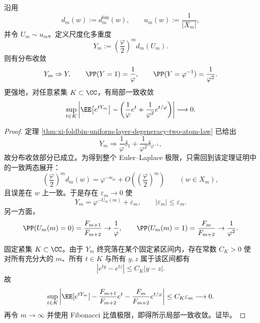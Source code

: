 \begin{theorem}\label{thm:conclusion-binfold-uniform-euler-laplace-twoatom}
沿用
\[
d_m(w):=d_m^{\mathrm{bin}}(w),
\qquad
u_m(w):=\frac{1}{|X_m|},
\]
并令 \(U_m\sim u_m\)。定义尺度化多重度
\[
Y_m:=\left(\frac{\varphi}{2}\right)^m d_m(U_m).
\]
则有分布收敛
\[
Y_m\Rightarrow Y,
\qquad
\PP(Y=1)=\frac{1}{\varphi},
\qquad
\PP(Y=\varphi^{-1})=\frac{1}{\varphi^2}.
\]
更强地，对任意紧集 \(K\subset\CC\)，有局部一致收敛
\[
\sup_{t\in K}
\left|
\EE\!\left[e^{tY_m}\right]
-
\left(
\frac{1}{\varphi}e^t+\frac{1}{\varphi^2}e^{t/\varphi}
\right)
\right|
\longrightarrow 0.
\]
\end{theorem}
\begin{proof}
定理 \ref{thm:xi-foldbin-uniform-layer-degeneracy-two-atom-law} 已给出
\[
Y_m\Rightarrow
\frac{1}{\varphi}\delta_1+\frac{1}{\varphi^2}\delta_{\varphi^{-1}},
\]
故分布收敛部分已成立。为得到整个 Euler--Laplace 极限，只需回到该定理证明中的一致两态展开：
\[
\left(\frac{\varphi}{2}\right)^m d_m(w)
=
\varphi^{-w_m}+O\!\left(\left(\frac{\varphi}{2}\right)^m\right)
\qquad (w\in X_m),
\]
且误差在 \(w\) 上一致。于是存在 \(\varepsilon_m\to 0\) 使
\[
Y_m=\varphi^{-U_m(m)}+\varepsilon_m,
\qquad
|\varepsilon_m|\le \varepsilon_m.
\]
另一方面，
\[
\PP(U_m(m)=0)=\frac{F_{m+1}}{F_{m+2}}\to \frac{1}{\varphi},
\qquad
\PP(U_m(m)=1)=\frac{F_m}{F_{m+2}}\to \frac{1}{\varphi^2}.
\]

固定紧集 \(K\subset\CC\)。由于 \(Y_m\) 终究落在某个固定紧区间内，存在常数 \(C_K>0\) 使对所有充分大的 \(m\)、所有 \(t\in K\) 与所有 \(y,z\) 属于该区间都有
\[
|e^{ty}-e^{tz}|\le C_K|y-z|.
\]
故
\[
\sup_{t\in K}
\left|
\EE[e^{tY_m}]
-
\frac{F_{m+1}}{F_{m+2}}e^t
-
\frac{F_m}{F_{m+2}}e^{t/\varphi}
\right|
\le
C_K\varepsilon_m
\longrightarrow 0.
\]
再令 \(m\to\infty\) 并使用 Fibonacci 比值极限，即得所示局部一致收敛。证毕。
\end{proof}

